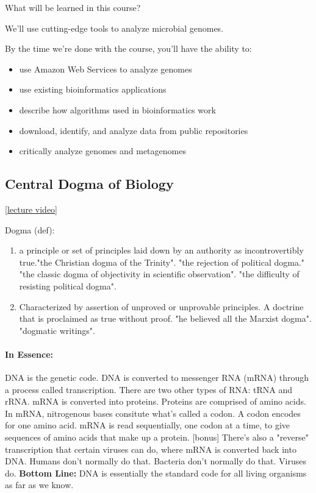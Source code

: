 What will be learned in this course?

We'll use cutting-edge tools to analyze microbial genomes.

By the time we're done with the course, you'll have the ability to:
\begin{itemize}
\item use Amazon Web Services to analyze genomes
\item use existing bioinformatics applications
\item describe how algorithms used in bioinformatics work
\item download, identify, and analyze data from public repositories
\item critically analyze genomes and metagenomes
\end{itemize}

\subsection{Central Dogma of Biology}
\href{https://www.youtube.com/watch?v=FRlNkKhbMAY&list=PLpPXw4zFa0uLMHwSZ7DMeLGjIUgo1IBbn&index=7}{[lecture video]}

Dogma (def):
\begin{enumerate}
\item
a principle or set of principles laid down by an authority as incontrovertibly true."the Christian dogma of the Trinity". "the rejection of political dogma." "the classic dogma of objectivity in scientific observation". "the difficulty of resisting political dogma".
\item
Characterized by assertion of unproved or unprovable principles. A doctrine that is proclaimed as true without proof. "he believed all the Marxist dogma". "dogmatic writings".
\end{enumerate}

\paragraph*{In Essence:} DNA is the genetic code. DNA is converted to messenger RNA (mRNA) through a process called transcription. There are two other types of RNA: tRNA and rRNA. mRNA is converted into proteins. Proteins are comprised of amino acids. In mRNA, nitrogenous bases consitute what's called a codon. A codon encodes for one amino acid. mRNA is read sequentially, one codon at a time, to give sequences of amino acids that make up a protein. [bonus] There's also a "reverse" transcription that certain viruses can do, where mRNA is converted back into DNA. Humans don't normally do that. Bacteria don't normally do that. Viruses do. \textbf{Bottom Line: }DNA is essentially the standard code for all living organisms as far as we know.

